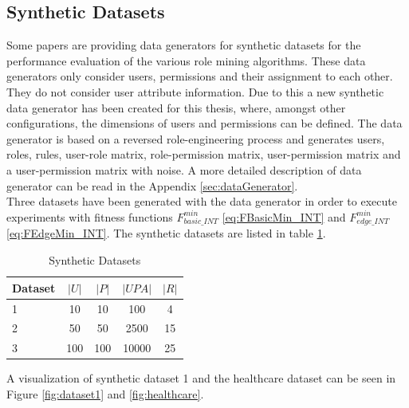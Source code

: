 \subsection{Synthetic Datasets}
Some papers are providing data generators for synthetic datasets for the performance evaluation of the various role mining algorithms\cite{Vaidya:2006:RMR:1180405.1180424}. These data generators only consider users, permissions and their assignment to each other. They do not consider user attribute information. Due to this a new synthetic data generator has been created for this thesis, where, amongst other configurations, the dimensions of users and permissions can be defined. The data generator is based on a reversed role-engineering process and generates users, roles, rules, user-role matrix, role-permission matrix, user-permission matrix and a user-permission matrix with noise. A more detailed description of data generator can be read in the Appendix \ref{sec:dataGenerator}.\\
Three datasets have been generated with the data generator in order to execute experiments with fitness functions $F_{basic\_INT}^{min}$ \eqref{eq:FBasicMin_INT} and $F_{edge\_INT}^{min}$ \eqref{eq:FEdgeMin_INT}. The synthetic datasets are listed in table \ref{tab:syntheticDatasets}.
\begin{table}[H]
    \centering
    \begin{tabular}{|l|c|c|c|c|}
        \hline
        \rowcolor{myGray} 
        \textbf{Dataset} & \textbf{$|U|$} & \textbf{$|P|$} & \textbf{$|UPA|$} & \textbf{$|R|$}\\ \hline
        1       & 10    & 10   & 100    & 4\\ \hline
        2       & 50    & 50   & 2500   & 15\\ \hline
        3       & 100   & 100  & 10000  & 25\\ \hline
    \end{tabular}
    \caption{Synthetic Datasets}
    \label{tab:syntheticDatasets}
\end{table}
A visualization of synthetic dataset 1 and the healthcare dataset can be seen in Figure \ref{fig:dataset1} and \ref{fig:healthcare}.

